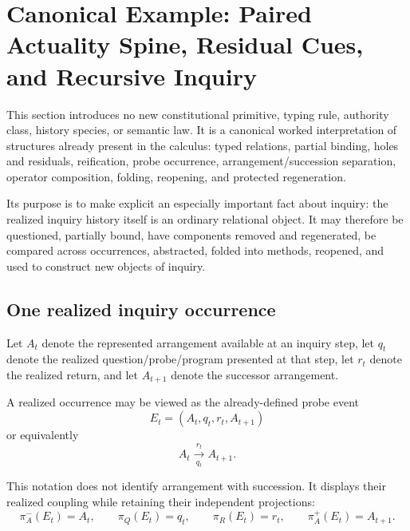 

\section{Canonical Example: Paired Actuality Spine, Residual Cues, and Recursive Inquiry}
\label{sec:paired-actuality-spine}

\begin{remark}
This section introduces no new constitutional primitive, typing rule, authority
class, history species, or semantic law.  It is a canonical worked
interpretation of structures already present in the calculus: typed relations,
partial binding, holes and residuals, reification, probe occurrence,
arrangement/succession separation, operator composition, folding, reopening,
and protected regeneration.

Its purpose is to make explicit an especially important fact about inquiry:
the realized inquiry history itself is an ordinary relational object.  It may
therefore be questioned, partially bound, have components removed and
regenerated, be compared across occurrences, abstracted, folded into methods,
reopened, and used to construct new objects of inquiry.
\end{remark}

\subsection{One realized inquiry occurrence}

Let \(A_t\) denote the represented arrangement available at an inquiry step,
let \(q_t\) denote the realized question/probe/program presented at that step,
let \(r_t\) denote the realized return, and let \(A_{t+1}\) denote the
successor arrangement.

A realized occurrence may be viewed as the already-defined probe event
\[
\boxed{
E_t=(A_t,q_t,r_t,A_{t+1})
}
\]
or equivalently
\[
\boxed{
A_t\xrightarrow[q_t]{r_t}A_{t+1}.
}
\]

This notation does not identify arrangement with succession.  It displays
their realized coupling while retaining their independent projections:
\[
\pi^-_A(E_t)=A_t,
\qquad
\pi_Q(E_t)=q_t,
\qquad
\pi_R(E_t)=r_t,
\qquad
\pi^+_A(E_t)=A_{t+1}.
\]

